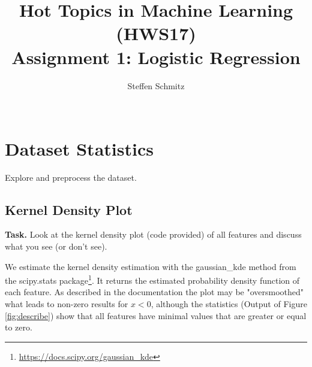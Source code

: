 \documentclass{support/acm_proc_article-sp}
\begin{document}
    \title{Hot Topics in Machine Learning (HWS17) \\ Assignment 1: Logistic Regression}

    \author{
    \alignauthor
    Steffen Schmitz\\
    \\
    }

    \maketitle


    \section{Dataset Statistics}
    \vspace{1.5\baselineskip}

    Explore and preprocess the dataset.


    \subsection{Kernel Density Plot}
    \label{sec:kdp}
    \vspace{\baselineskip}

    \textbf{Task.} Look at the kernel density plot (code provided) of all features and discuss what you see (or don't see).

    We estimate the kernel density estimation with the gaussian\_kde method from the scipy.stats
    package\footnote{\href{https://docs.scipy.org/doc/scipy/reference/generated/scipy.stats.gaussian_kde.html}{https://docs.scipy.org/gaussian\_kde}}.
    It returns the estimated probability density function of each feature.
    As described in the documentation the plot may be "oversmoothed" what leads to non-zero results for $x < 0$,
    although the statistics (Output of Figure \ref{fig:describe}) show that all features have minimal values that are
    greater or equal to zero.
\end{document}
